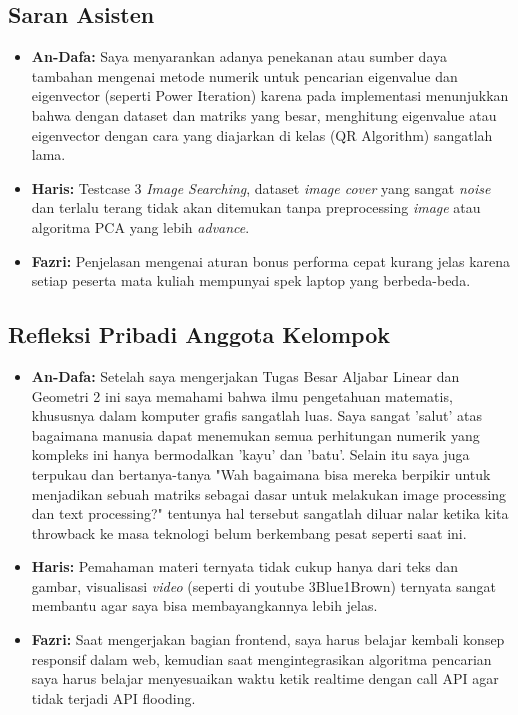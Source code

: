 \documentclass[12pt,a4paper]{article}
\begin{document}
\subsection{Saran Asisten}
\begin{itemize}
    \item \textbf{An-Dafa:}  Saya menyarankan adanya penekanan atau sumber daya tambahan mengenai metode numerik untuk pencarian eigenvalue dan eigenvector (seperti Power Iteration) karena pada implementasi menunjukkan bahwa dengan dataset dan matriks yang besar, menghitung eigenvalue atau eigenvector dengan cara yang diajarkan di kelas (QR Algorithm) sangatlah lama.
    \item \textbf{Haris:}  Testcase 3 \textit{Image Searching}, dataset \textit{image cover} yang sangat \textit{noise} dan terlalu terang tidak akan ditemukan tanpa preprocessing \textit{image} atau algoritma PCA yang lebih \textit{advance}.
    \item \textbf{Fazri:}  Penjelasan mengenai aturan bonus performa cepat kurang jelas karena setiap peserta mata kuliah mempunyai spek laptop yang berbeda-beda.
\end{itemize}

\subsection{Refleksi Pribadi Anggota Kelompok}
\begin{itemize}
    \item \textbf{An-Dafa:} Setelah saya mengerjakan Tugas Besar Aljabar Linear dan Geometri 2 ini saya memahami bahwa ilmu pengetahuan matematis, khususnya dalam komputer grafis sangatlah luas. Saya sangat 'salut' atas bagaimana manusia dapat menemukan semua perhitungan numerik yang kompleks ini hanya bermodalkan 'kayu' dan 'batu'. Selain itu saya juga terpukau dan bertanya-tanya "Wah bagaimana bisa mereka berpikir untuk menjadikan sebuah matriks sebagai dasar untuk melakukan image processing dan text processing?" tentunya hal tersebut sangatlah diluar nalar ketika kita throwback ke masa teknologi belum berkembang pesat seperti saat ini. 
    \item \textbf{Haris:} Pemahaman materi ternyata tidak cukup hanya dari teks dan gambar, visualisasi \textit{video} (seperti di youtube 3Blue1Brown\cite{3Blue1Brown}) ternyata sangat membantu agar saya bisa membayangkannya lebih jelas. 
    \item \textbf{Fazri:}  Saat mengerjakan bagian frontend, saya harus belajar kembali konsep responsif dalam web, kemudian saat mengintegrasikan algoritma pencarian saya harus belajar menyesuaikan waktu ketik realtime dengan call API agar tidak terjadi API flooding. 
\end{itemize}
\end{document}
